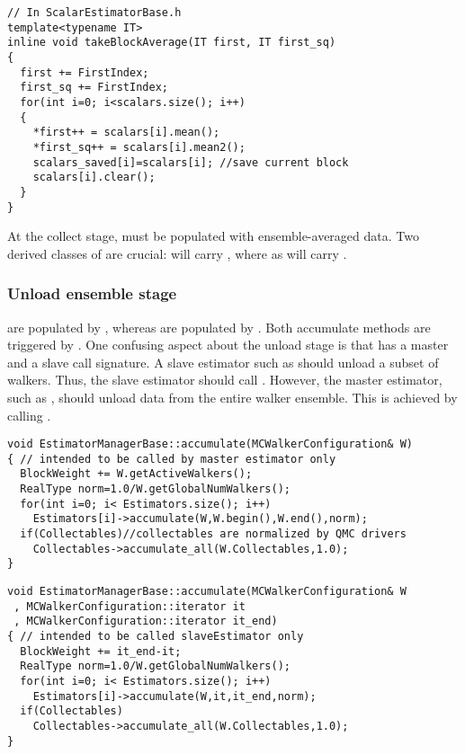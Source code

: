 \begin{lstlisting}
// In ScalarEstimatorBase.h
template<typename IT>
inline void takeBlockAverage(IT first, IT first_sq)
{
  first += FirstIndex;
  first_sq += FirstIndex;
  for(int i=0; i<scalars.size(); i++)
  {
    *first++ = scalars[i].mean();
    *first_sq++ = scalars[i].mean2();
    scalars_saved[i]=scalars[i]; //save current block
    scalars[i].clear();
  }
}
\end{lstlisting}

At the collect stage,  must be populated with ensemble-averaged data. Two derived classes of  are crucial:  will carry , where as  will carry .

\subsubsection{Unload ensemble stage}
 are populated by
, whereas
 are populated by
 . Both
accumulate methods are triggered by
. One confusing aspect about
the unload stage is that  has
a master and a slave call signature. A slave estimator such as
 should unload a subset of
walkers. Thus, the slave estimator should call
. However, the master estimator, such
as , should unload data from
the entire walker ensemble. This is achieved by calling
.

\begin{lstlisting}
void EstimatorManagerBase::accumulate(MCWalkerConfiguration& W)
{ // intended to be called by master estimator only
  BlockWeight += W.getActiveWalkers();
  RealType norm=1.0/W.getGlobalNumWalkers();
  for(int i=0; i< Estimators.size(); i++)
    Estimators[i]->accumulate(W,W.begin(),W.end(),norm);
  if(Collectables)//collectables are normalized by QMC drivers
    Collectables->accumulate_all(W.Collectables,1.0);
}
\end{lstlisting}

\begin{lstlisting}
void EstimatorManagerBase::accumulate(MCWalkerConfiguration& W
 , MCWalkerConfiguration::iterator it
 , MCWalkerConfiguration::iterator it_end)
{ // intended to be called slaveEstimator only
  BlockWeight += it_end-it;
  RealType norm=1.0/W.getGlobalNumWalkers();
  for(int i=0; i< Estimators.size(); i++)
    Estimators[i]->accumulate(W,it,it_end,norm);
  if(Collectables)
    Collectables->accumulate_all(W.Collectables,1.0);
}
\end{lstlisting}

